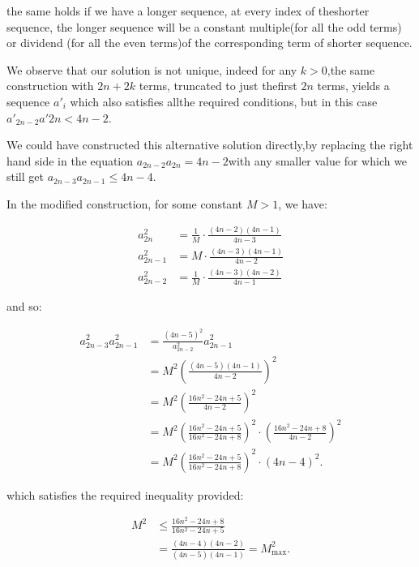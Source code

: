 \begin{enumerate}
 

 the same holds if we have a longer sequence, at every index of theshorter sequence, the longer sequence will be a constant multiple(for all the odd terms) or dividend (for all the even terms)of the corresponding term of shorter sequence.

 We observe that our solution is not unique, indeed for any $k>0$,the same construction with $2n+2k$ terms, truncated to just thefirst $2n$ terms, yields a sequence $a'_i$ which also satisfies allthe required conditions, but in this case $a'_{2n-2}a'{2n} < 4n-2$.

 We could have constructed this alternative solution directly,by replacing the right hand side in the equation $a_{2n-2}a_{2n} = 4n-2$with any smaller value for which we still get $a_{2n-3}a_{2n-1} \le 4n-4$.

 In the modified construction, for some constant $M > 1$, we have:

 
 \begin{align*} 	a_{2n}^2 &= \frac{1}{M}\cdot \frac{(4n-2)(4n-1)}{4n-3} \\ 	a_{2n-1}^2 &= M\cdot \frac{(4n-3)(4n-1)}{4n-2} \\ 	a_{2n-2}^2 &= \frac{1}{M}\cdot \frac{(4n-3)(4n-2)}{4n-1} \end{align*}


 

 and so:

 
 \begin{align*} 	a_{2n-3}^2a_{2n-1}^2 &= \frac{(4n-5)^2}{a_{2n-2}^2}a_{2n-1}^2 \\ 	    &= M^2\left(\frac{(4n-5)(4n-1)}{4n-2}\right)^2 \\ 	    &= M^2\left(\frac{16n^2 -24n + 5}{4n-2}\right)^2 \\ 	    &= M^2\left(\frac{16n^2 -24n + 5}{16n^2 -24n + 8}\right)^2 		    \cdot \left(\frac{16n^2 -24n + 8}{4n-2}\right)^2 \\ 	    &= M^2\left(\frac{16n^2 -24n + 5}{16n^2 -24n + 8}\right)^2 		\cdot (4n-4)^2. \end{align*}


 

 which satisfies the required inequality provided:

 
 \begin{align*}     M^2 &\le \frac{16n^2 -24n + 8}{16n^2 -24n + 5} \\         &= \frac{(4n-4)(4n-2)}{(4n-5)(4n-1)} = M_{\mathrm{max}}^2. \end{align*}



\end{enumerate}
